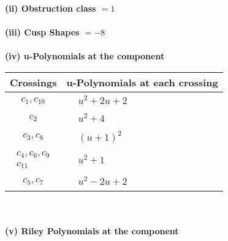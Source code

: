 \documentclass[1p]{elsarticle_modified}
\theoremstyle{definition}
\begin{document}
\flushleft \textbf{(ii) Obstruction class $= 1$}\\~\\
\flushleft \textbf{(iii) Cusp Shapes $= -8$}\\~\\
\newpage\renewcommand{\arraystretch}{1}
\flushleft \textbf{(iv) u-Polynomials at the component}\newline \\
\begin{tabular}{m{50pt}|m{274pt}}
Crossings & \hspace{64pt}u-Polynomials at each crossing \\
\hline $$\begin{aligned}c_{1},c_{10}\end{aligned}$$&$\begin{aligned}
&u^2+2 u+2
\end{aligned}$\\
\hline $$\begin{aligned}c_{2}\end{aligned}$$&$\begin{aligned}
&u^2+4
\end{aligned}$\\
\hline $$\begin{aligned}c_{3},c_{8}\end{aligned}$$&$\begin{aligned}
&(u+1)^2
\end{aligned}$\\
\hline $$\begin{aligned}c_{4},c_{6},c_{9}\\c_{11}\end{aligned}$$&$\begin{aligned}
&u^2+1
\end{aligned}$\\
\hline $$\begin{aligned}c_{5},c_{7}\end{aligned}$$&$\begin{aligned}
&u^2-2 u+2
\end{aligned}$\\
\hline
\end{tabular}\\~\\
\newpage\renewcommand{\arraystretch}{1}
\flushleft \textbf{(v) Riley Polynomials at the component}\newline \\
\end{document}
